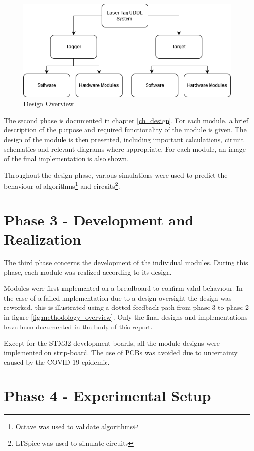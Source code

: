 \begin{figure}[H]
	\centering
	\includegraphics[width=0.7\linewidth]{figures/methodology/design_overview}
	\caption{Design Overview}
	\label{fig:designoverview}
\end{figure}

The second phase is documented in chapter \ref{ch_design}. For each module, a brief description of the purpose and required functionality of the module is given. The design of the module is then presented, including important calculations, circuit schematics and relevant diagrams where appropriate. For each module, an image of the final implementation is also shown.

Throughout the design phase, various simulations were used to predict the behaviour of algorithms\footnote{Octave was used to validate algorithms} and circuits\footnote{LTSpice was used to simulate circuits}.


\section{Phase 3 - Development and Realization}

The third phase concerns the development of the individual modules. During this phase, each module was realized according to its design.

Modules were first implemented on a breadboard to confirm valid behaviour. In the case of a failed implementation due to a design oversight the design was reworked, this is illustrated using a dotted feedback path from phase 3 to phase 2 in figure \ref{fig:methodology_overview}. Only the final designs and implementations have been documented in the body of this report.

Except for the STM32 development boards, all the module designs were implemented on strip-board. The use of PCBs was avoided due to uncertainty caused by the COVID-19 epidemic.



\section{Phase 4 - Experimental Setup}

